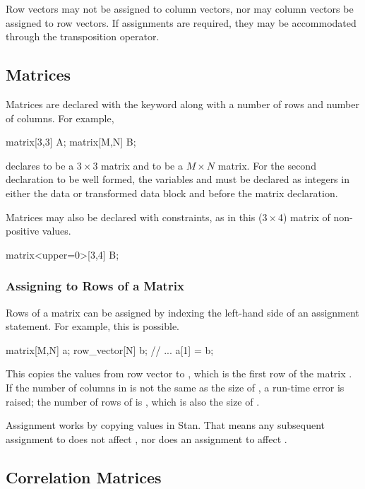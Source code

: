 Row vectors may not be assigned to column vectors, nor may column
vectors be assigned to row vectors.  If assignments are required, they
may be accommodated through the transposition operator.

\subsection{Matrices}

Matrices are declared with the keyword  along with a
number of rows and number of columns.  For example,
%
\begin{stancode}
matrix[3,3] A;
matrix[M,N] B;
\end{stancode}
%
declares  to be a $3 \times 3$ matrix and  to be a $M
\times N$ matrix.  For the second declaration to be well formed, the
variables  and  must be declared as integers in either
the data or transformed data block and before the matrix declaration.

Matrices may also be declared with constraints, as in this ($3 \times $4)
matrix of non-positive values.
%
\begin{stancode}
matrix<upper=0>[3,4] B;
\end{stancode}
%

\subsubsection{Assigning to Rows of a Matrix}

Rows of a matrix can be assigned by indexing the left-hand side of an
assignment statement. For example, this is possible.
%
\begin{stancode}
matrix[M,N] a;
row_vector[N] b;
// ...
a[1] = b;
\end{stancode}
%
This copies the values from row vector  to , which
is the first row of the matrix .  If the number of columns in
 is not the same as the size of , a run-time error is
raised;  the number of rows of  is , which is also the
size of .

Assignment works by copying values in Stan.  That means any subsequent
assignment to  does not affect , nor does an
assignment to  affect .


\subsection{Correlation Matrices}

